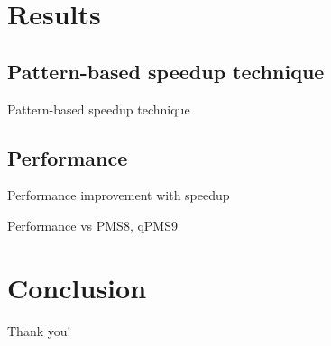 \documentclass[pdf]{beamer}
\begin{document}
\section{Results}
	\subsection{Pattern-based speedup technique}
	\begin{frame}{Pattern-based speedup technique}

		\end{frame}

	\subsection{Performance}
	\begin{frame}{Performance improvement with speedup}

		\end{frame}

	\begin{frame}{Performance vs PMS8, qPMS9}

		\end{frame}

\section{Conclusion}

\begin{frame}
	\centering
	Thank you!
\end{frame}
\end{document}
